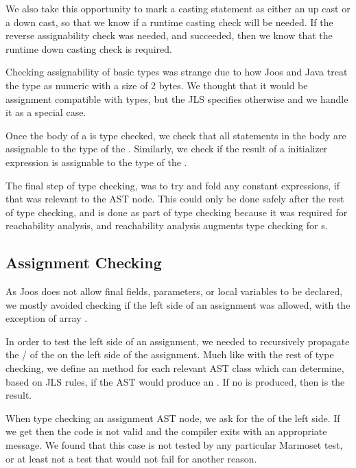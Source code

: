 \documentclass[pdftex,11pt,a4paper]{article}
\begin{document}
We also take this opportunity to mark a casting statement as either an
up cast or a down cast, so that we know if a runtime casting check
will be needed. If the reverse assignability check was needed, and
succeeded, then we know that the runtime down casting check is
required.

Checking assignability of basic types was strange due to how Joos and
Java treat the  type as numeric with a size of 2 bytes. We
thought that it would be assignment compatible with  types,
but the JLS specifies otherwise and we handle it as a special case.

Once the body of a  is type checked, we check that all
 statements in the body are assignable to the type of the
. Similarly, we check if the result of a 
initializer expression is assignable to the type of the .

The final step of type checking, was to try and fold any constant
expressions, if that was relevant to the AST node. This could only be
done safely after the rest of type checking, and is done as part of
type checking because it was required for reachability analysis, and
reachability analysis augments type checking for s.

\subsection{Assignment Checking}

As Joos does not allow final fields, parameters, or local variables to
be declared, we mostly avoided checking if the left side of an
assignment was allowed, with the exception of array .

In order to test the left side of an assignment, we needed to
recursively propagate the / of the
 on the left side of the assignment. Much like with
the rest of type checking, we define an  method for each
relevant AST class which can determine, based on JLS rules, if the AST
would produce an . If no  is produced, then
 is the result.

When type checking an assignment AST node, we ask for the 
of the left side. If we get  then the code is not valid and
the compiler exits with an appropriate message. We found that this
case is not tested by any particular Marmoset test, or at least not a
test that would not fail for another reason.
\end{document}
